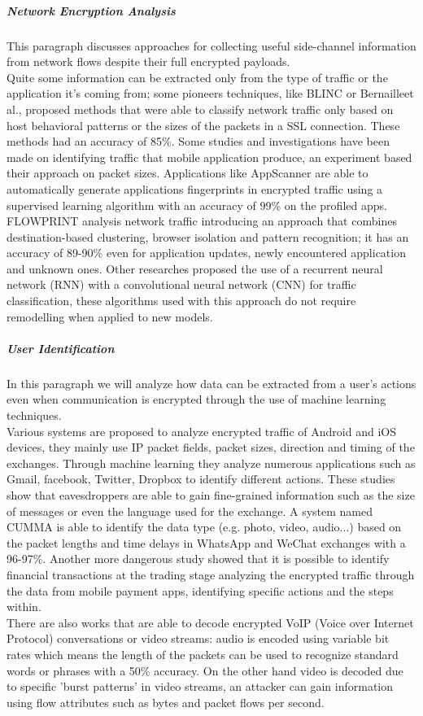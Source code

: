 \subparagraph{Network Encryption Analysis} This paragraph discusses approaches for collecting useful side-channel information 
from network flows despite their full encrypted payloads. 
\\Quite some information can be extracted only from the type of traffic or the application it's coming from;
some pioneers techniques, like BLINC or Bernailleet al., proposed methods that were able to classify network traffic only 
based on host behavioral patterns or the sizes of the packets in a SSL connection. These methods had an accuracy of 85\%. 
Some studies and investigations have been made on identifying traffic that mobile application produce, an experiment 
based their approach on packet sizes. Applications like AppScanner are able to automatically generate applications fingerprints 
in encrypted traffic using a supervised learning algorithm with an accuracy of 99\% on the profiled apps. FLOWPRINT analysis network traffic introducing an 
approach that combines destination-based clustering, browser isolation and pattern recognition; it has an accuracy of 89-90\% even for application updates, 
newly encountered application and unknown ones. Other researches proposed the use of a recurrent neural network (RNN) with a convolutional neural network (CNN) for traffic classification, 
these algorithms used with this approach do not require remodelling when applied to new models. \cite{ntaApplications}
\subparagraph{User Identification} In this paragraph we will analyze how data can be extracted from a user's actions even when communication is encrypted through the use of machine learning techniques.
\\Various systems are proposed to analyze encrypted traffic of Android and iOS devices, they mainly use IP packet fields, packet sizes, direction and timing of the exchanges. 
Through machine learning they analyze numerous applications such as Gmail, facebook, Twitter, Dropbox to identify different actions. These studies show that eavesdroppers are able to gain fine-grained 
information such as the size of messages or even the language used for the exchange. A system named CUMMA is able to identify the data type (e.g. photo, video, audio...) based on the packet lengths and time delays in WhatsApp and WeChat exchanges with a 96-97\%.
Another more dangerous study showed that it is possible to identify financial transactions at the trading stage analyzing the encrypted traffic through the data from mobile payment apps, identifying specific actions and the steps within. 
\\There are also works that are able to decode encrypted VoIP (Voice over Internet Protocol) conversations or video streams: audio is encoded using variable bit rates which means the length of the packets can be used to recognize standard words or phrases with a 50\% accuracy. 
On the other hand video is decoded due to specific 'burst patterns' in video streams, an attacker can gain information using flow attributes such as bytes and packet flows per second. \cite{ntaApplications}

